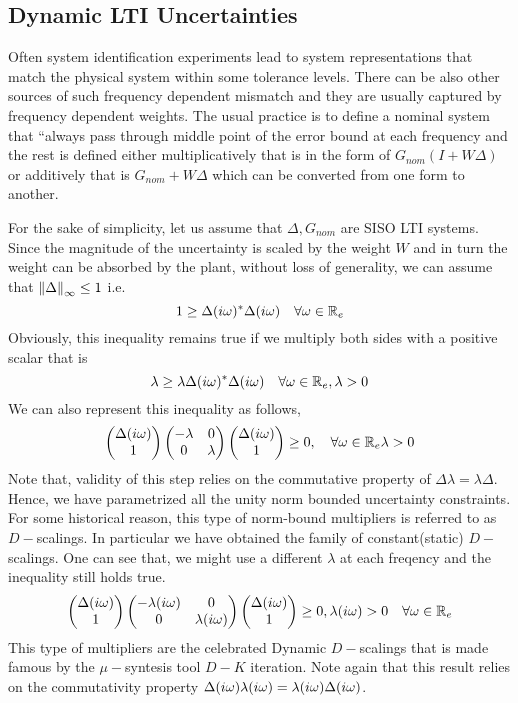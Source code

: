 \subsection{Dynamic LTI Uncertainties}
Often system identification experiments lead to system representations that match the physical 
system within some tolerance levels. There can be also other sources of such frequency dependent 
mismatch and they are usually captured by frequency dependent weights. The usual practice 
is to define a nominal system that ``always pass through middle point of the error bound at 
each frequency and the rest is defined either multiplicatively that is in the form of $G_{nom}
(I+W\Delta)$ or additively that is $G_{nom} + W\Delta$ which can be converted from one form to 
another. 

For the sake of simplicity, let us assume that $\Delta, G_{nom}$ are SISO LTI systems. Since the 
magnitude of the uncertainty is scaled by the weight $W$ and in turn the weight can be absorbed
by the plant, without loss of generality, we can assume 
that $\displaystyle \left\| \Delta \right\|_\infty\leq 1$ i.e. 
\[
1 \geq \Delta(i\omega)^*\Delta(i\omega) \quad \forall \omega\in\mathbb{R}_e
\]
Obviously, this inequality remains true if we multiply both sides with a positive scalar that is
\[
\lambda \geq \lambda\Delta(i\omega)^*\Delta(i\omega) \quad \forall \omega\in\mathbb{R}_e ,\lambda>0
\]
We can also represent this inequality as follows,
\[
\begin{pmatrix}\Delta(i\omega) \\ 1\end{pmatrix}\begin{pmatrix}-\lambda &0\\0 &\lambda\end{pmatrix}\begin{pmatrix}\Delta(i\omega) \\ 1\end{pmatrix}\geq 0, \quad 
\forall \omega\in\mathbb{R}_e \lambda>0
\]
Note that, validity of this step relies on the commutative property of 
$\Delta \lambda = \lambda\Delta$. Hence, we have parametrized all the unity
norm bounded uncertainty constraints. For some historical reason, this type 
of norm-bound multipliers is referred to as $D-$scalings. In particular we have obtained 
the family of constant(static) $D-$scalings. 
One can see that, we might use a different $\lambda$ at each freqency and the inequality 
still holds true. 
\[
\begin{pmatrix}\Delta(i\omega) \\ 1\end{pmatrix}\begin{pmatrix}-\lambda(i\omega) &0\\0 &\lambda(i\omega)\end{pmatrix}\begin{pmatrix}\Delta(i\omega) \\ 1\end{pmatrix}\geq 0, \lambda(i\omega)>0
\quad \forall \omega\in\mathbb{R}_e 
\]
This type of multipliers are the celebrated Dynamic $D-$scalings that is made famous 
by the $\mu-$syntesis tool $D-K$ iteration. Note again that this result relies on the 
commutativity property $\Delta(i\omega)\lambda(i\omega) = \lambda(i\omega)\Delta(i\omega)$. 

